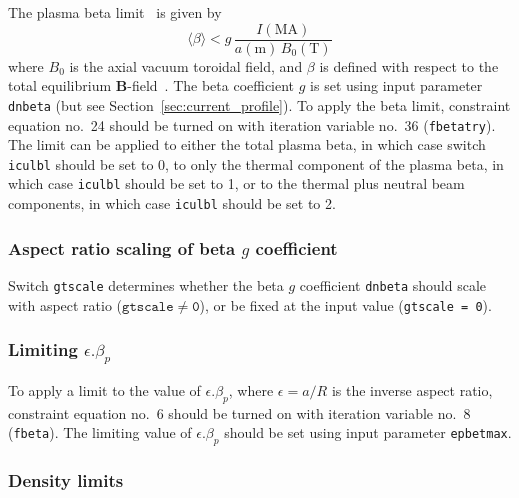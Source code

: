 \documentclass[11pt,a4paper]{report}
\begin{document}
The plasma beta limit~\cite{IPDG,172} is given by
\begin{equation}
\langle \beta \rangle < g \, \frac{I(\mbox{MA})}{a(\mbox{m}) \, B_0(\mbox{T})}
\label{eq:troyon}
\end{equation}
where $B_0$ is the axial vacuum toroidal field, and $\beta$ is defined with
respect to the total equilibrium $\mathbf{B}$-field~\cite{172}. The beta
coefficient $g$ is set using input parameter \texttt{dnbeta} (but see
Section~\ref{sec:current_profile}). To apply the beta limit, constraint
equation no.\ 24 should be turned on with iteration variable no.\ 36
(\texttt{fbetatry}). The limit can be applied to either the total plasma beta,
in which case switch \texttt{iculbl} should be set to 0, to only the thermal
component of the plasma beta, in which case \texttt{iculbl} should be set to
1, or to the thermal plus neutral beam components, in which case
\texttt{iculbl} should be set to 2.

\subsubsection*{Aspect ratio scaling of beta $g$ coefficient}

Switch \texttt{gtscale} determines whether the beta $g$ coefficient
\texttt{dnbeta} should scale with aspect ratio ($\mathtt{gtscale \not= 0}$),
or be fixed at the input value (\texttt{gtscale = 0}).

\subsubsection*{Limiting $\epsilon.\beta_p$}

To apply a limit to the value of $\epsilon.\beta_p$, where $\epsilon = a/R$ is
the inverse aspect ratio, constraint equation no.\ 6 should be turned on with
iteration variable no.\ 8 (\texttt{fbeta}). The limiting value of
$\epsilon.\beta_p$ should be set using input parameter \texttt{epbetmax}.

\subsubsection{Density limits}
\end{document}
